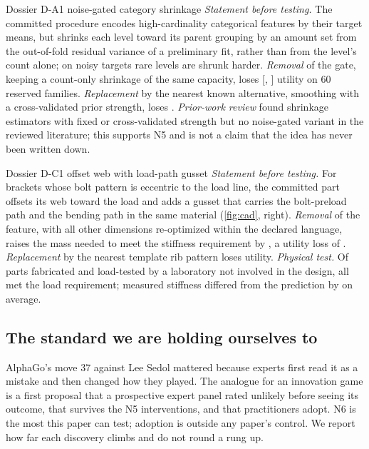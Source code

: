 \begin{ezdef}{Dossier D-A1 \quad\normalfont\sffamily\color{ezink}noise-gated category shrinkage \synbadge}
\textit{Statement before testing.} The committed procedure encodes high-cardinality categorical
features by their target means, but shrinks each level toward its parent grouping by an amount set
from the out-of-fold residual variance of a preliminary fit, rather than from the level's count
alone; on noisy targets rare levels are shrunk harder. \textit{Removal} of the gate, keeping a
count-only shrinkage of the same capacity, loses \syn[EZ-G16]{\EZdaRemove}
[\syn[EZ-G16]{\EZdaRemoveLo}, \syn[EZ-G16]{\EZdaRemoveHi}] utility on 60 reserved families.
\textit{Replacement} by the nearest known alternative, smoothing with a cross-validated prior
strength, loses \syn[EZ-G16]{\EZdaReplace}. \textit{Prior-work review} found shrinkage estimators
with fixed or cross-validated strength but no noise-gated variant in the reviewed literature; this
supports N5 and is not a claim that the idea has never been written down.
\end{ezdef}

\begin{ezdef}{Dossier D-C1 \quad\normalfont\sffamily\color{ezink}offset web with load-path gusset \synbadge}
\textit{Statement before testing.} For brackets whose bolt pattern is eccentric to the load line, the
committed part offsets its web toward the load and adds a gusset that carries the bolt-preload path
and the bending path in the same material (\cref{fig:cad}, right). \textit{Removal} of the feature,
with all other dimensions re-optimized within the declared language, raises the mass needed to meet
the stiffness requirement by \syn[EZ-G17]{\EZdcMass\%}, a utility loss of \syn[EZ-G17]{\EZdcRemove}. \textit{Replacement} by the nearest
template rib pattern loses \syn[EZ-G17]{\EZdcReplace} utility. \textit{Physical test.} Of
\syn[EZ-G17]{\EZphysN} parts fabricated and load-tested by a laboratory not involved in the design,
all met the load requirement; measured stiffness differed from the prediction by
\syn[EZ-G17]{\EZphysErr\%} on average.
\end{ezdef}

\subsection{The standard we are holding ourselves to}

AlphaGo's move 37 against Lee Sedol mattered because experts first read it as a mistake and then
changed how they played. The analogue for an innovation game is a first proposal that a prospective
expert panel rated unlikely before seeing its outcome, that survives the N5 interventions, and that
practitioners adopt. N6 is the most this paper can test; adoption is outside any paper's control.
We report how far each discovery climbs and do not round a rung up.
